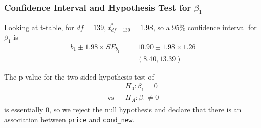 \documentclass[handout]{beamer}
\newcommand{\blue}[1]{\textcolor{blue2}{#1}}
\begin{document}
\begin{frame}[fragile]
\frametitle{Confidence Interval and Hypothesis Test for $\beta_1$}
%
%
Looking at t-table, for $df=139$, $t^*_{df=139} = 1.98$, so a 95\% confidence interval for $\beta_1$ is
\begin{eqnarray*}
b_1 \pm 1.98 \times SE_{b_1} &=& 10.90 \pm 1.98 \times 1.26\\
&=& (8.40, 13.39)
\end{eqnarray*}

\pause\vspace{0.5cm}

The p-value for the two-sided hypothesis test of
\begin{eqnarray*}
&& H_0: \beta_1 = 0\\
\mbox{vs}&& H_A: \beta_1 \neq 0 
\end{eqnarray*}
is essentially 0, so we \blue{reject the null hypothesis} and declare that there is an association between {\tt price} and {\tt cond\_new}.

\end{frame}
\end{document}
